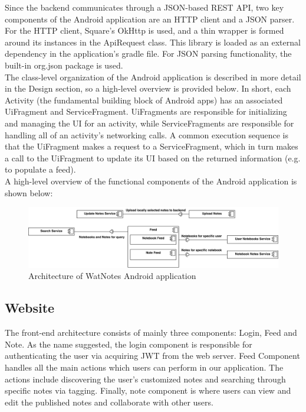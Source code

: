 \documentclass[12pt]{article}
\begin{document}
    Since the backend communicates through a JSON-based REST API, two key components of the
    Android application are an HTTP client and a JSON parser. For the HTTP client, Square's
    OkHttp is used, and a thin wrapper is formed around its instances in the ApiRequest class.
    This library is loaded as an external dependency in the application's gradle file.
    For JSON parsing functionality, the built-in org.json package is used. \\

    The class-level organization of the Android application is described in more detail in the Design section,
    so a high-level overview is provided below. In short, each Activity (the fundamental building block of Android apps)
    has an associated UiFragment and ServiceFragment. UiFragments are responsible for initializing and managing the UI
    for an activity, while ServiceFragments are responsible for handling all of an activity's networking calls. A common
    execution sequence is that the UiFragment makes a request to a ServiceFragment, which in turn makes a call to
    the UiFragment to update its UI based on the returned information (e.g. to populate a feed). \\

    A high-level overview of the functional components of the Android application is shown below: \\
    \begin{figure}[H]
      \includegraphics[width=\textwidth]{assets/android-arch.pdf}
      \caption{Architecture of WatNotes Android application}
    \end{figure}

  \subsection{Website}

  The front-end architecture consists of mainly three components: Login, Feed and Note. As the name suggested, the login component is responsible for authenticating the user via acquiring JWT from the web server. Feed Component handles all the main actions which users can perform in our application. The actions include discovering the user's customized notes and searching through specific notes via tagging. Finally, note component is where users can view and edit the published notes and collaborate with other users. \\
\end{document}
